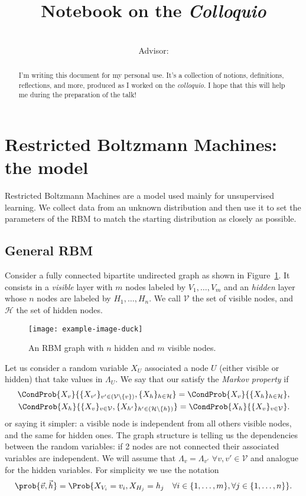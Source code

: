 \documentclass[]{article}
\title{
  {\Huge Notebook on the \textit{Colloquio}} \\
  \colloquioTitle
}
\author{
  \myFullName \\
  {\small Advisor: \advisorFullName}
}
\begin{document}
  \maketitle
  \begin{abstract}
    I'm writing this document for my personal use. It's a collection of notions,
    definitions, reflections, and more, produced as I worked on the \textit{colloquio}.
    I hope that this will help me during the preparation of the talk!
  \end{abstract}
  \tableofcontents
  \clearpage
  
  
  \section{Restricted Boltzmann Machines: the model}
  Restricted Boltzmann Machines are a model used mainly for unsupervised learning. We collect
  data from an unknown distribution and then use it to set the parameters of the RBM to match
  the starting distribution as closely as possible.
  
  \subsection{General RBM}
  Consider a fully connected bipartite undirected graph as shown in Figure~\ref{fig:generalRBM}.
  It consists in a \emph{visible} layer with $m$ nodes labeled by \(V_1, \dots, V_m\) and an
  \emph{hidden} layer whose \(n\) nodes are labeled by \(H_1, \dots, H_n\). We call \(\mathcal{V}\)
  the set of visible nodes, and \(\mathcal{H}\) the set of hidden nodes.
  \begin{figure}
    \centering
    \texttt{[image: example-image-duck]}
    \caption{An RBM graph with \(n\) hidden and \(m\) visible nodes.}
    \label{fig:generalRBM}
  \end{figure}
  Let us consider a random variable \(X_U\) associated a node \(U\) (either visible or hidden)
  that take values in \(\Lambda_U\). We say that our  satisfy the \emph{Markov
  property} if 
  \begin{align*}
    \CondProb{X_v}{\{X_{v'}\}_{v'\in (\mathcal{V} \setminus \{v\})}, \{X_h\}_{h\in \mathcal{H}}} =
    \CondProb{X_v}{\{X_h\}_{h\in \mathcal{H}}}, \\
    \CondProb{X_h}{\{X_v\}_{v\in \mathcal{V}}, \{X_{h'}\}_{h'\in (\mathcal{H} \setminus \{h\})}} =
    \CondProb{X_h}{\{X_v\}_{v\in \mathcal{V}}}.
  \end{align*}
  or saying it simpler: a visible node is independent from all others visible nodes,
  and the same for hidden ones. The graph structure is telling us the dependencies between
  the random variables: if 2 nodes are not connected their associated variables are independent.
  We will assume that \(\Lambda_v = \Lambda_{v'} \,\, \forall v,v' \in \mathcal{V}\) and analogue
  for the hidden variables. For simplicity we use the notation
  \[\prob{\vec{v}, \vec{h}} = \Prob{X_{V_i} = v_i, X_{H_j} = h_j
                                    \quad\forall i \in \{1,\dots,m\}, \forall j \in \{1,\dots,n\}}.\]
  
\end{document}
